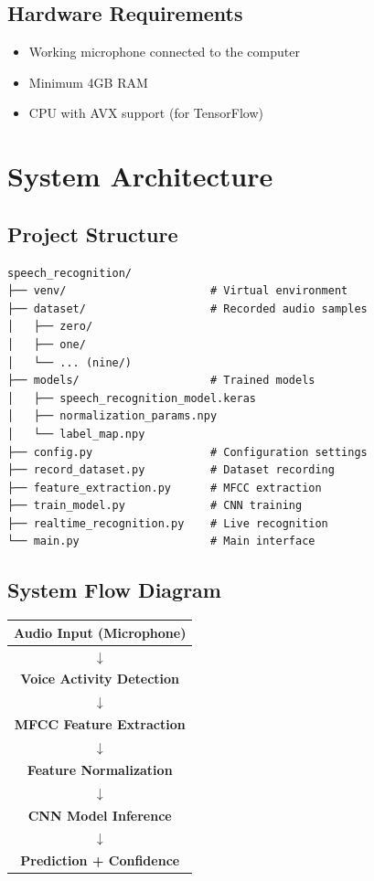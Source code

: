 \documentclass[a4paper,12pt]{article}
\begin{document}
\subsection{Hardware Requirements}
\begin{itemize}
    \item Working microphone connected to the computer
    \item Minimum 4GB RAM
    \item CPU with AVX support (for TensorFlow)
\end{itemize}

\section{System Architecture}

\subsection{Project Structure}
\begin{verbatim}
speech_recognition/
├── venv/                      # Virtual environment
├── dataset/                   # Recorded audio samples
│   ├── zero/
│   ├── one/
│   └── ... (nine/)
├── models/                    # Trained models
│   ├── speech_recognition_model.keras
│   ├── normalization_params.npy
│   └── label_map.npy
├── config.py                  # Configuration settings
├── record_dataset.py          # Dataset recording
├── feature_extraction.py      # MFCC extraction
├── train_model.py             # CNN training
├── realtime_recognition.py    # Live recognition
└── main.py                    # Main interface
\end{verbatim}

\subsection{System Flow Diagram}
\begin{center}
\begin{tabular}{|c|}
\hline
\textbf{Audio Input (Microphone)} \\
\hline
$\downarrow$ \\
\hline
\textbf{Voice Activity Detection} \\
\hline
$\downarrow$ \\
\hline
\textbf{MFCC Feature Extraction} \\
\hline
$\downarrow$ \\
\hline
\textbf{Feature Normalization} \\
\hline
$\downarrow$ \\
\hline
\textbf{CNN Model Inference} \\
\hline
$\downarrow$ \\
\hline
\textbf{Prediction + Confidence} \\
\hline
\end{tabular}
\end{center}
\end{document}
